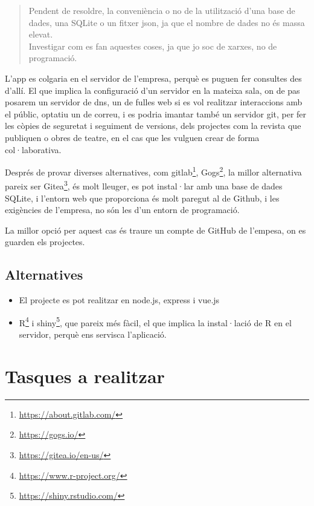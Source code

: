 \documentclass[
  10pt,
]{krantz}
\DeclareRobustCommand{\href}[2]{#2\footnote{\url{#1}}}
\providecommand{\tightlist}{%
  \setlength{\itemsep}{0pt}\setlength{\parskip}{0pt}}
\begin{document}
\begin{quote}
Pendent de resoldre, la conveniència o no de la utilització d'una base de dades, una SQLite o un fitxer json, ja que el nombre de dades no és massa elevat.\\
Investigar com es fan aquestes coses, ja que jo soc de xarxes, no de programació.
\end{quote}

L'app es colgaria en el servidor de l'empresa, perquè es puguen fer consultes des d'allí. El que implica la configuració d'un servidor en la mateixa sala, on de pas posarem un servidor de dns, un de fulles web si es vol realitzar interaccions amb el públic, optatiu un de correu, i es podria imantar també un servidor git, per fer les còpies de seguretat i seguiment de versions, dels projectes com la revista que publiquen o obres de teatre, en el cas que les vulguen crear de forma col·laborativa.

Després de provar diverses alternatives, com \href{https://about.gitlab.com/}{gitlab}, \href{https://gogs.io/}{Gogs}, la millor alternativa pareix ser \href{https://gitea.io/en-us/}{Gitea}, és molt lleuger, es pot instal·lar amb una base de dades SQLite, i l'entorn web que proporciona és molt paregut al de Github, i les exigències de l'empresa, no són les d'un entorn de programació.

La millor opció per aquest cas és traure un compte de GitHub de l'empesa, on es guarden els projectes.

\hypertarget{alternatives}{%
\subsection{Alternatives}\label{alternatives}}

\begin{itemize}
\tightlist
\item
  El projecte es pot realitzar en node.js, express i vue.js
\item
  \href{https://www.r-project.org/}{R} i \href{https://shiny.rstudio.com/}{shiny}, que pareix més fàcil, el que implica la instal·lació de R en el servidor, perquè ens servisca l'aplicació.
\end{itemize}

\hypertarget{tasques-a-realitzar}{%
\section{Tasques a realitzar}\label{tasques-a-realitzar}}
\end{document}
